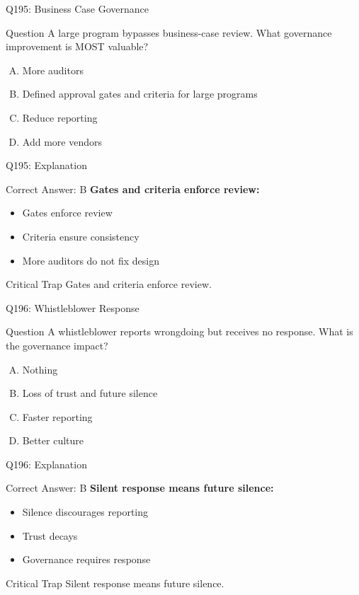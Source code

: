 \documentclass{beamer}
\begin{document}
	\begin{frame}{Q195: Business Case Governance}
		\begin{block}{Question}
			A large program bypasses business-case review. What governance improvement is MOST valuable?
		\end{block}
		\begin{enumerate}[(A)]
			\item More auditors
			\item Defined approval gates and criteria for large programs
			\item Reduce reporting
			\item Add more vendors
		\end{enumerate}
	\end{frame}
	
	\begin{frame}{Q195: Explanation}
		\begin{block}{Correct Answer: B}
			\textbf{Gates and criteria enforce review:}
			\begin{itemize}
				\item Gates enforce review
				\item Criteria ensure consistency
				\item More auditors do not fix design
			\end{itemize}
		\end{block}
		\begin{alertblock}{Critical Trap}
			Gates and criteria enforce review.
		\end{alertblock}
	\end{frame}
	
	\begin{frame}{Q196: Whistleblower Response}
		\begin{block}{Question}
			A whistleblower reports wrongdoing but receives no response. What is the governance impact?
		\end{block}
		\begin{enumerate}[(A)]
			\item Nothing
			\item Loss of trust and future silence
			\item Faster reporting
			\item Better culture
		\end{enumerate}
	\end{frame}
	
	\begin{frame}{Q196: Explanation}
		\begin{block}{Correct Answer: B}
			\textbf{Silent response means future silence:}
			\begin{itemize}
				\item Silence discourages reporting
				\item Trust decays
				\item Governance requires response
			\end{itemize}
		\end{block}
		\begin{alertblock}{Critical Trap}
			Silent response means future silence.
		\end{alertblock}
	\end{frame}
	
\end{document}
